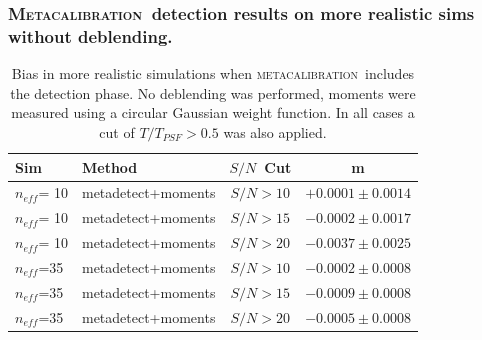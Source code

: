 \documentclass{beamer}
\newcommand{\mcal}{\textsc{metacalibration}}
\newcommand{\Mcal}{\textsc{Metacalibration}}
\newcommand{\snr}{$S/N$}
\newcommand{\neff}{$n_{eff}$}
\begin{document}
\begin{frame}
    \frametitle{\Mcal\ detection results on more realistic sims without deblending.}

 
    \begin{table}
        \centering
        \begin{tabular}{|l|l|c|c|}
            \hline
            Sim & Method         & \snr\ Cut & m             \\
            \hline

            \hline
            \neff={\color{green} 10} & metadetect+moments    & \snr$ > 10$ & $+0.0001 \pm 0.0014$  \\
            \neff={\color{green} 10} & metadetect+moments    & \snr$ > 15$ & $-0.0002 \pm 0.0017$  \\
            \neff={\color{green} 10} & metadetect+moments    & \snr$ > 20$ & $-0.0037 \pm 0.0025$  \\
            \hline
            \neff={\color{brightred}35}    & metadetect+moments    & \snr$ > 10$ & $-0.0002 \pm 0.0008$  \\
            \neff={\color{brightred}35}    & metadetect+moments    & \snr$ > 15$ & $-0.0009 \pm 0.0008$  \\
            \neff={\color{brightred}35}    & metadetect+moments    & \snr$ > 20$ & $-0.0005 \pm 0.0008$  \\
            \hline

        \end{tabular}
        \caption{Bias in more realistic simulations when \mcal\ includes
            the detection phase.  No deblending was performed, 
            moments were measured using a circular Gaussian weight function.
            In all cases a cut of $T/T_{PSF} > 0.5$ was also applied.
        \label{tab:mcal:deblending}}
    \end{table}


\end{frame}
\end{document}
